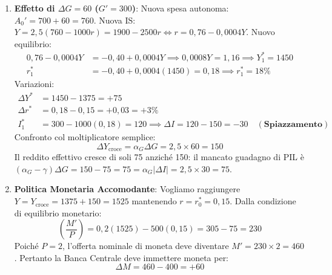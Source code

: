 \begin{esercizio}
\begin{enumerate}
    \item \textbf{Effetto di $\Delta G = 60$ ($G' = 300$)}:
    Nuova spesa autonoma: $A_0' = 700 + 60 = 760$.
    Nuova IS: $Y = 2{,}5(760 - 1000 r) = 1900 - 2500 r \iff r = 0{,}76 - 0{,}0004 Y$.
    Nuovo equilibrio:
    \begin{align*}
        0{,}76 - 0{,}0004 Y &= -0{,}40 + 0{,}0004 Y \implies 0{,}0008 Y = 1{,}16 \implies Y_1^* = 1450 \\
        r_1^* &= -0{,}40 + 0{,}0004(1450) = 0{,}18 \implies r_1^* = 18\%
    \end{align*}
    Variazioni:
    \begin{align*}
        \Delta Y^* &= 1450 - 1375 = +75 \\
        \Delta r^* &= 0{,}18 - 0{,}15 = +0{,}03 = +3\% \\
        I_1^* &= 300 - 1000(0{,}18) = 120 \implies \Delta I = 120 - 150 = -30 \quad (\textbf{Spiazzamento})
    \end{align*}
    Confronto col moltiplicatore semplice:
    \begin{equation*}
        \Delta Y_{\text{croce}} = \alpha_G \Delta G = 2{,}5 \times 60 = 150
    \end{equation*}
    Il reddito effettivo cresce di soli 75 anziché 150: il mancato guadagno di PIL è $(\alpha_G - \gamma)\Delta G = 150 - 75 = 75 = \alpha_G |\Delta I| = 2{,}5 \times 30 = 75$.

    \item \textbf{Politica Monetaria Accomodante}:
    Vogliamo raggiungere $Y = Y_{\text{croce}} = 1375 + 150 = 1525$ mantenendo $r = r_0^* = 0{,}15$.
    Dalla condizione di equilibrio monetario:
    \begin{equation*}
        \left(\frac{M'}{P}\right) = 0{,}2(1525) - 500(0{,}15) = 305 - 75 = 230
    \end{equation*}
    Poiché $P = 2$, l'offerta nominale di moneta deve diventare $M' = 230 \times 2 = 460$.
    Pertanto la Banca Centrale deve immettere moneta per:
    \begin{equation*}
        \Delta M = 460 - 400 = +60
    \end{equation*}
\end{enumerate}
\end{esercizio}

